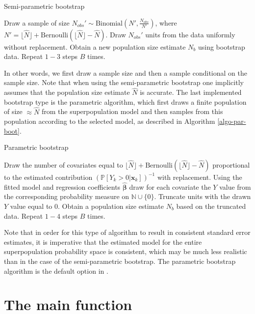 \documentclass[
]{jss}
\newcommand{\1}{\mathcal{I}} \newcommand{\bZero}{\boldsymbol{0}}
\begin{document}
\begin{algorithm}[ht!]
\small
\caption{Semi-parametric bootstrap}
\label{algo-semipar-boot}\DontPrintSemicolon
{} Draw a sample of size $N_{obs}'\sim\text{Binomial}\left(N', \frac{N_{obs}}{N'}\right)$, where $N'=\lfloor\hat{N}\rfloor+\text{Bernoulli}\left(\lfloor\hat{N}\rfloor-\hat{N}\right)$.\;
 Draw $N_{obs}'$ units from the data uniformly without replacement.\;
 Obtain a new population size estimate $N_b$ using bootstrap data.\;
 Repeat $1-3$ steps $B$ times.
\end{algorithm}

In other words, we first draw a sample size and then a sample
conditional on the sample size. Note that when using the semi-parametric
bootstrap one implicitly assumes that the population size estimate
\(\hat{N}\) is accurate. The last implemented bootstrap type is the
parametric algorithm, which first draws a finite population of size
\(\approx\hat{N}\) from the superpopulation model and then samples from
this population according to the selected model, as described in
Algorithm \ref{algo-par-boot}.

\begin{algorithm}[ht!]
\small
\caption{Parametric bootstrap}
\label{algo-par-boot}\DontPrintSemicolon
{} Draw the number of covariates equal to $\lfloor\hat{N}\rfloor+\text{Bernoulli}\left(\lfloor\hat{N}\rfloor-\hat{N}\right)$ proportional to the estimated contribution $(\mathbb{P}\left[Y_{k}>0|\boldsymbol{x}_{k}\right])^{-1}$ with replacement.\;
 Using the fitted model and regression coefficients $\hat{\boldsymbol{\beta}}$ draw for each covariate the $Y$ value from the corresponding probability measure on $\mathbb{N}\cup\{0\}$.\;
 Truncate units with the drawn $Y$ value equal to $0$.\;
 Obtain a population size estimate $N_b$ based on the truncated data.\;
 Repeat $1-4$ steps $B$ times.
\end{algorithm}

Note that in order for this type of algorithm to result in consistent
standard error estimates, it is imperative that the estimated model for
the entire superpopulation probability space is consistent, which may be
much less realistic than in the case of the semi-parametric bootstrap.
The parametric bootstrap algorithm is the default option in
.

\section{The main function}\label{sec-main}
\end{document}
